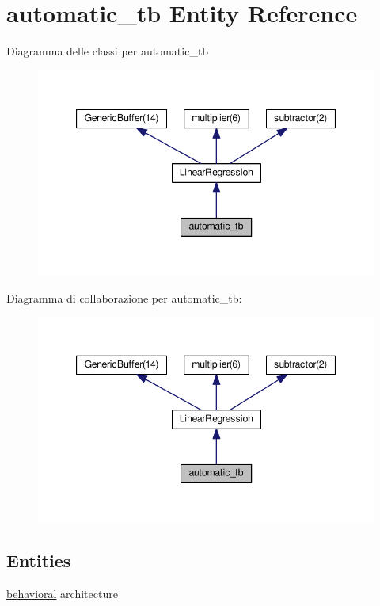 \hypertarget{classautomatic__tb}{}\section{automatic\+\_\+tb Entity Reference}
\label{classautomatic__tb}


Diagramma delle classi per automatic\+\_\+tb\nopagebreak
\begin{figure}[H]
\begin{center}
\leavevmode
\includegraphics[width=347pt]{classautomatic__tb__inherit__graph}
\end{center}
\end{figure}


Diagramma di collaborazione per automatic\+\_\+tb\+:\nopagebreak
\begin{figure}[H]
\begin{center}
\leavevmode
\includegraphics[width=347pt]{classautomatic__tb__coll__graph}
\end{center}
\end{figure}
\subsection*{Entities}
\begin{DoxyCompactItemize}
\item 
\hyperlink{classautomatic__tb_1_1behavioral}{behavioral} architecture
\end{DoxyCompactItemize}

